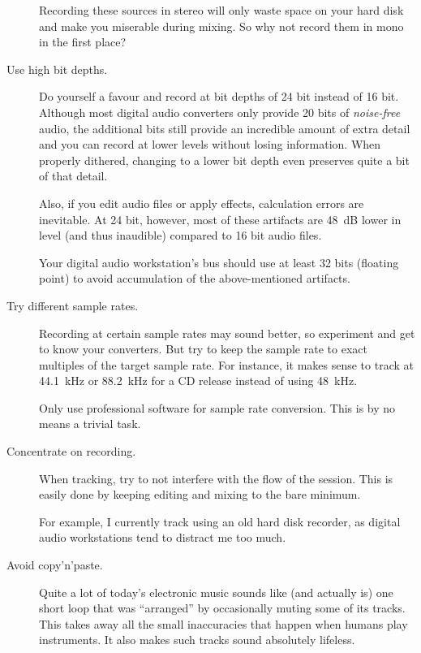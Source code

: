 \begin{description}
  Recording these sources in stereo will only waste space on your hard
  disk and make you miserable during mixing.  So why not record them
  in mono in the first place?

\item[Use high bit depths.]  Do yourself a favour and record at bit
  depths of 24 bit instead of 16 bit.  Although most digital audio
  converters only provide 20 bits of \emph{noise-free} audio, the
  additional bits still provide an incredible amount of extra detail
  and you can record at lower levels without losing information.  When
  properly dithered, changing to a lower bit depth even preserves
  quite a bit of that detail.

  Also, if you edit audio files or apply effects, calculation errors
  are inevitable.  At 24 bit, however, most of these artifacts are
  \SI{48}{\dB} lower in level (and thus inaudible) compared to 16 bit
  audio files.

  Your digital audio workstation's bus should use at least 32 bits
  (floating point) to avoid accumulation of the above-mentioned
  artifacts.

\item[Try different sample rates.]  Recording at certain sample rates
  may sound better, so experiment and get to know your converters.
  But try to keep the sample rate to exact multiples of the target
  sample rate.  For instance, it makes sense to track at
  \SI{44.1}{\kilo\hertz} or \SI{88.2}{\kilo\hertz} for a CD release
  instead of using \SI{48}{\kilo\hertz}.

  Only use professional software for sample rate conversion.  This is
  by no means a trivial task.

\item[Concentrate on recording.]  When tracking, try to not interfere
  with the flow of the session.  This is easily done by keeping
  editing and mixing to the bare minimum.

  For example, I currently track using an old hard disk recorder, as
  digital audio workstations tend to distract me too much.

\item[Avoid copy'n'paste.]  Quite a lot of today's electronic music
  sounds like (and actually is) one short loop that was ``arranged''
  by occasionally muting some of its tracks.  This takes away all the
  small inaccuracies that happen when humans play instruments.  It
  also makes such tracks sound absolutely lifeless.


\end{description}
